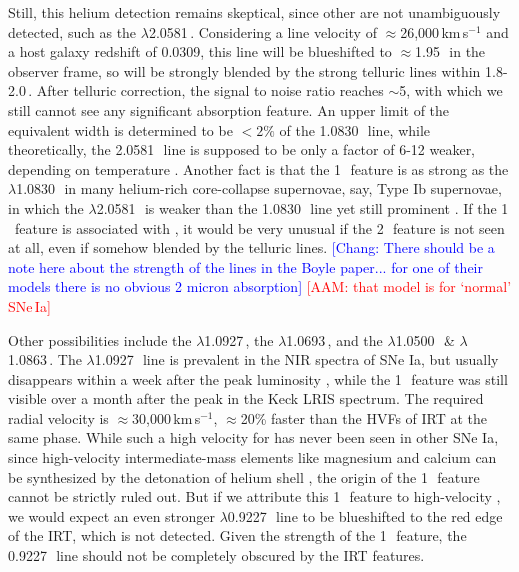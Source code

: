 \documentclass[twocolumn]{aastex631}
\newcommand{\adam}[1]{\textcolor{red}{[AAM: #1]}}
\newcommand{\chang}[1]{\textcolor{blue}{[Chang: #1]}}
\begin{document}
Still, this helium detection remains skeptical, since other  are not unambiguously detected, such as the  $\lambda$2.0581\,\micron. Considering a line velocity of $\approx$26,000\,km\,s$^{-1}$ and a host galaxy redshift of 0.0309, this line will be blueshifted to $\approx$1.95\,\micron\ in the observer frame, so will be strongly blended by the strong telluric lines within 1.8-2.0\,\micron. After telluric correction, the signal to noise ratio reaches $\sim$5, with which we still cannot see any significant absorption feature. An upper limit of the equivalent width is determined to be $<$$2\%$ of the 1.0830\,\micron\ line, while theoretically, the 2.0581\,\micron\ line is supposed to be only a factor of 6-12 weaker, depending on temperature \citep{Marion2009_NIR}. Another fact is that the 1\,\micron\ feature is as strong as the  $\lambda$1.0830\,\micron\ in many helium-rich core-collapse supernovae, say, Type Ib supernovae, in which the  $\lambda$2.0581\,\micron\ is weaker than the 1.0830\,\micron\ line yet still prominent \citep{CSP_Ibc_2022}. If the 1\,\micron\ feature is associated with , it would be very unusual if the 2\,\micron\ feature is not seen at all, even if somehow blended by the telluric lines. \chang{There should be a note here about the strength of the lines in the Boyle paper... for one of their models there is no obvious 2 micron absorption} \adam{that model is for `normal' SNe\,Ia}

Other possibilities include the  $\lambda$1.0927\,\micron, the  $\lambda$1.0693\,\micron, and the  $\lambda$1.0500\,\micron\ \& $\lambda$1.0863\,\micron. The  $\lambda$1.0927\,\micron\ line is prevalent in the NIR spectra of SNe Ia, but usually disappears within a week after the peak luminosity \citep{Marion2009_NIR}, while the 1\,\micron\ feature was still visible over a month after the peak in the Keck LRIS spectrum. The required radial velocity is $\approx$30,000\,km\,s$^{-1}$, $\approx$20\% faster than the HVFs of  IRT at the same phase. While such a high velocity for  has never been seen in other SNe Ia, since high-velocity intermediate-mass elements like magnesium and calcium can be synthesized by the detonation of helium shell \citep{Shen_DD_2014}, the  origin of the 1\,\micron\ feature cannot be strictly ruled out. But if we attribute this 1\,\micron\ feature to high-velocity , we would expect an even stronger $\lambda$0.9227\,\micron\ line to be blueshifted to the red edge of the  IRT, which is not detected. Given the strength of the 1\,\micron\ feature, the 0.9227\,\micron\ line should not be completely obscured by the  IRT features. 
\end{document}

